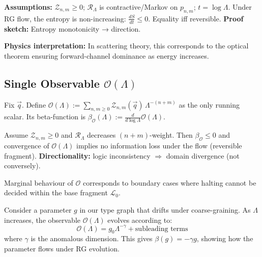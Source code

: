 \begin{proposition}
\label{thm:entropy-monotonicity}
\textbf{Assumptions:} $\mathcal{Z}_{n,m}\ge0$; $\mathcal{R}_\Lambda$ is contractive/Markov on $p_{n,m}$; $t=\log\Lambda$.
Under RG flow, the entropy is non-increasing: $\frac{dS}{dt} \leq 0$. Equality iff reversible.
\textbf{Proof sketch:} Entropy monotonicity → direction.

\textbf{Physics interpretation:} In scattering theory, this corresponds to the optical theorem ensuring forward-channel dominance as energy increases.
\end{proposition}

\subsection{Single Observable $\mathcal{O}(\Lambda)$}

\begin{definition}
\label{def:global-observable}
Fix $\vec{q}$. Define $\mathcal{O}(\Lambda):=\sum_{n,m\ge0}\mathcal{Z}_{n,m}(\vec{q})\,\Lambda^{-(n+m)}$ as the only running scalar. Its beta-function is $\beta_\mathcal{O}(\Lambda):=\frac{d}{d\log\Lambda}\mathcal{O}(\Lambda)$.
\end{definition}

\begin{proposition}
\label{prop:rg-corresp}
Assume $\mathcal{Z}_{n,m}\ge0$ and $\mathcal{R}_\Lambda$ decreases $(n+m)$-weight.
Then $\beta_\mathcal{O}\le0$ and convergence of $\mathcal{O}(\Lambda)$ implies
no information loss under the flow (reversible fragment). \textbf{Directionality:} logic inconsistency $\Rightarrow$ domain divergence (not conversely).
\end{proposition}

\begin{conjecture}
\label{conj:marginal}
Marginal behaviour of $\mathcal{O}$ corresponds to boundary cases where halting cannot
be decided within the base fragment $\mathcal{L}_0$.
\end{conjecture}

\begin{example}
\label{ex:synthetic-rg-flow}
Consider a parameter $g$ in our type graph that drifts under coarse-graining. As $\Lambda$ increases, the observable $\mathcal{O}(\Lambda)$ evolves according to:
\[
\mathcal{O}(\Lambda) = g_0 \Lambda^{-\gamma} + \text{subleading terms}
\]
where $\gamma$ is the anomalous dimension. This gives $\beta(g) = -\gamma g$, showing how the parameter flows under RG evolution.
\end{example}

